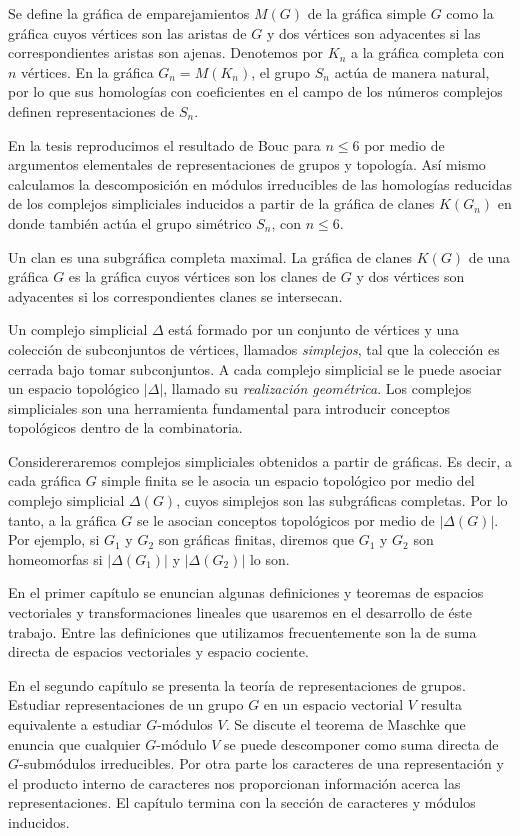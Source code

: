 \documentclass[12pt]{book}
\theoremstyle{definition}
\newcounter{in}
\newcounter{ini}
\begin{document}
Se define la gráfica de emparejamientos $M(G)$ de la gráfica simple
$G$ como la gráfica cuyos vértices son las aristas de $G$ y dos
vértices son adyacentes si las correspondientes aristas son
ajenas. Denotemos por $K_{n}$ a la gráfica completa con $n$
vértices. En la gráfica $G_{n}=M(K_{n})$, el grupo $S_{n}$ actúa de
manera natural, por lo que sus homologías con coeficientes en el campo
de los números complejos definen representaciones de $S_{n}$.

En la tesis reproducimos el resultado de Bouc para $n\leq 6$ por medio de
argumentos elementales de representaciones de grupos y topología. Así mismo
calculamos la descomposición en módulos irreducibles de las homologías
reducidas de los complejos simpliciales inducidos a partir de la
gráfica de clanes $K(G_{n})$ en donde también actúa el grupo simétrico
$S_{n}$, con $n\leq 6$.

Un clan es una subgráfica completa maximal. La gráfica de clanes
$K(G)$ de una gráfica $G$ es la gráfica cuyos vértices son los clanes
de $G$ y dos vértices son adyacentes si los correspondientes clanes se
intersecan.

Un complejo simplicial $\Delta$ está formado por un conjunto de
vértices y una colección de subconjuntos de vértices, llamados
\emph{simplejos}, tal que la colección es cerrada bajo tomar
subconjuntos. A cada complejo simplicial se le puede asociar un
espacio topológico $|\Delta|$, llamado su \emph{realización
  geométrica}. Los complejos simpliciales son una herramienta
fundamental para introducir conceptos topológicos dentro de la
combinatoria. 

Considereraremos complejos simpliciales obtenidos a partir de
gráficas. Es decir, a cada gráfica $G$ simple finita se le asocia un
espacio topológico por medio del complejo simplicial $\Delta(G)$, cuyos
simplejos son las subgráficas completas. Por lo tanto, a la gráfica
$G$ se le asocian conceptos topológicos por medio de
$|\Delta(G)|$. Por ejemplo, si $G_{1}$ y $G_{2}$ son gráficas finitas,
diremos que $G_{1}$ y $G_{2}$ son homeomorfas si $|\Delta(G_{1})|$
y $|\Delta(G_{2})|$ lo son.

En el primer capítulo se enuncian algunas definiciones y teoremas
de espacios vectoriales y transformaciones lineales que usaremos en el
desarrollo de éste trabajo. Entre las definiciones que utilizamos
frecuentemente son la de suma directa de espacios vectoriales y
espacio cociente. 

En el segundo capítulo se presenta la teoría de representaciones de
grupos. Estudiar representaciones de un grupo $G$ en un espacio
vectorial $V$ resulta equivalente a estudiar $G$-módulos $V$. Se
discute el teorema de Maschke que enuncia que cualquier $G$-módulo $V$
se puede descomponer como suma directa de $G$-submódulos
irreducibles. Por otra parte los caracteres de una
representación y el producto interno de caracteres nos proporcionan información
acerca las representaciones. El capítulo termina con la sección de
caracteres y módulos inducidos.
\end{document}

